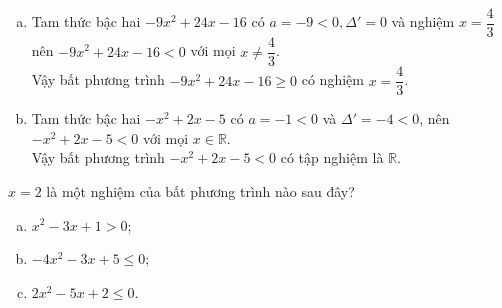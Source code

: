 \begin{bt}
{\begin{enumerate}[a)]
			Vậy bất phương trình có tập nghiệm là $\left(-\infty;\dfrac{-3-\sqrt{17}}{4}\right] \cup \left[\dfrac{-3+\sqrt{17}}{4};+\infty \right)$.
			\item Tam thức bậc hai $-9x^2+24x-16$ có $a=-9<0, \Delta'=0$ và nghiệm $x=\dfrac{4}{3}$ nên $-9x^2+24x-16<0$ với mọi $x \ne \dfrac{4}{3}$.\\
			Vậy bất phương trình $-9x^2+24x-16 \geq 0$ có nghiệm $x=\dfrac{4}{3}$.
			\item Tam thức bậc hai $-x^2+2x-5$ có $a=-1<0$ và $\Delta'=-4<0$, nên $-x^2+2x-5<0$ với mọi $x \in \mathbb{R}$.\\
			Vậy bất phương trình $-x^2+2x-5<0$ có tập nghiệm là $\mathbb{R}$.
		\end{enumerate}
	}
\end{bt}

\begin{bt}%
	$x=2$ là một nghiệm của bất phương trình nào sau đây?
	\begin{enumerate}[a)]
		\item $x^2-3x+1>0$;
		\item $-4x^2-3x+5 \leq 0$;
		\item $2x^2-5x+2 \leq 0$.
	\end{enumerate}
\end{bt}

